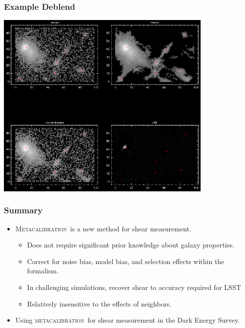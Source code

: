 \documentclass{beamer}
\newcommand{\mcal}{\textsc{metacalibration}}
\newcommand{\Mcal}{\textsc{Metacalibration}}
\begin{document}
\frame
{
    \frametitle{Example Deblend}
 
    \begin{center}
        \includegraphics[width=0.8\textwidth]{nbrsim-003f-009969-modelcomp-sub000006-crop.png}
        \newline
    \end{center}

}




\frame
{
    \frametitle{Summary}
    \begin{itemize}
        \item \Mcal\ is a new method for shear measurement.
            \begin{itemize}
                \item Does not require significant prior knowledge about galaxy properties.
                \item Correct for noise bias, model bias, and selection effects within 
                    the formalism.

                \item In challenging simulations, recover shear to accuracy required
                    for LSST

                \item Relatively insensitive to the effects of neighbors.

            \end{itemize}

        \item Using \mcal\ for shear measurement in the Dark Energy Survey.

    \end{itemize}
}
\end{document}

